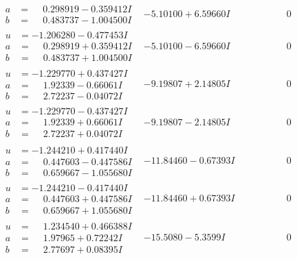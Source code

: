 \documentclass[1p]{elsarticle_modified}
\theoremstyle{definition}
\begin{document}
$$\begin{array}{c|c|c}
\begin{aligned}
a &= \phantom{-}0.298919 - 0.359412 I \\
b &= \phantom{-}0.483737 - 1.004500 I\end{aligned}
 & -5.10100 + 6.59660 I & \phantom{-0.000000 } 0 \\ \hline\begin{aligned}
u &= -1.206280 - 0.477453 I \\
a &= \phantom{-}0.298919 + 0.359412 I \\
b &= \phantom{-}0.483737 + 1.004500 I\end{aligned}
 & -5.10100 - 6.59660 I & \phantom{-0.000000 } 0 \\ \hline\begin{aligned}
u &= -1.229770 + 0.437427 I \\
a &= \phantom{-}1.92339 - 0.66061 I \\
b &= \phantom{-}2.72237 - 0.04072 I\end{aligned}
 & -9.19807 + 2.14805 I & \phantom{-0.000000 } 0 \\ \hline\begin{aligned}
u &= -1.229770 - 0.437427 I \\
a &= \phantom{-}1.92339 + 0.66061 I \\
b &= \phantom{-}2.72237 + 0.04072 I\end{aligned}
 & -9.19807 - 2.14805 I & \phantom{-0.000000 } 0 \\ \hline\begin{aligned}
u &= -1.244210 + 0.417440 I \\
a &= \phantom{-}0.447603 - 0.447586 I \\
b &= \phantom{-}0.659667 - 1.055680 I\end{aligned}
 & -11.84460 - 0.67393 I & \phantom{-0.000000 } 0 \\ \hline\begin{aligned}
u &= -1.244210 - 0.417440 I \\
a &= \phantom{-}0.447603 + 0.447586 I \\
b &= \phantom{-}0.659667 + 1.055680 I\end{aligned}
 & -11.84460 + 0.67393 I & \phantom{-0.000000 } 0 \\ \hline\begin{aligned}
u &= \phantom{-}1.234540 + 0.466388 I \\
a &= \phantom{-}1.97965 + 0.72242 I \\
b &= \phantom{-}2.77697 + 0.08395 I\end{aligned}
 & -15.5080 - 5.3599 I & \phantom{-0.000000 } 0 \\ \hline\begin{aligned}

\end{aligned}
\end{array}$$
\end{document}
